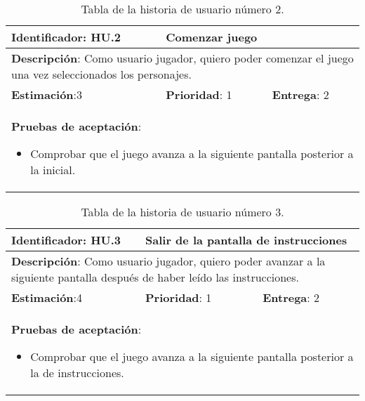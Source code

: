 \begin{table}[h]
  \begin{center}
    \begin{tabular}{|p{4cm}|p{4cm}|p{4cm}|}

    \hline
    \textbf{Identificador}: HU.2
    & \multicolumn{2}{p{8cm}|}{Comenzar juego}\\

    \hline
    \multicolumn{3}{|p{12cm}|}{\textbf{Descripción}: Como usuario jugador, quiero poder comenzar el juego una vez seleccionados los personajes.}\\

    \hline
    \textbf{Estimación}:3
    & \textbf{Prioridad}: 1
    & \textbf{Entrega}: 2\\

    \hline
    \multicolumn{3}{|p{12cm}|}{\textbf{Pruebas de aceptación}:
      \begin{itemize}
        \item Comprobar que el juego avanza a la siguiente pantalla posterior a la inicial.
      \end{itemize}
    }\\

    \hline

    \end{tabular}

    \caption{Tabla de la historia de usuario número 2.}
    \label{tabla-hu2}

  \end{center}
\end{table}

\begin{table}[h]
  \begin{center}
    \begin{tabular}{|p{4cm}|p{4cm}|p{4cm}|}

    \hline
    \textbf{Identificador}: HU.3
    & \multicolumn{2}{p{8cm}|}{Salir de la pantalla de instrucciones}\\

    \hline
    \multicolumn{3}{|p{12cm}|}{\textbf{Descripción}: Como usuario jugador, quiero poder avanzar a la siguiente pantalla después de haber leído las instrucciones.}\\

    \hline
    \textbf{Estimación}:4
    & \textbf{Prioridad}: 1
    & \textbf{Entrega}: 2\\

    \hline
    \multicolumn{3}{|p{12cm}|}{\textbf{Pruebas de aceptación}:
      \begin{itemize}
        \item Comprobar que el juego avanza a la siguiente pantalla posterior a la de instrucciones.
      \end{itemize}
    }\\

    \hline

    \end{tabular}

    \caption{Tabla de la historia de usuario número 3.}
    \label{tabla-hu3}

  \end{center}
\end{table}

